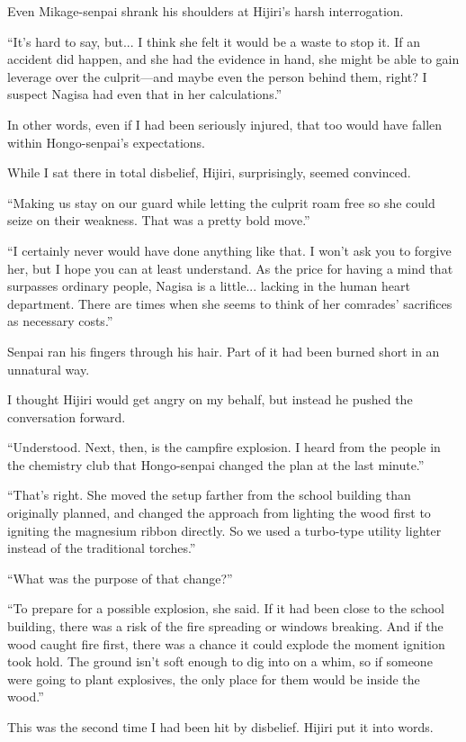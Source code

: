 \documentclass[
    a4paper,
    12pt,
    twoside,
    openany,
    UTF8,
    fontset=windows
]{ctexbook}
\begin{document}
Even Mikage-senpai shrank his shoulders at Hijiri's harsh interrogation.

``It's hard to say, but... I think she felt it would be a waste to stop it. If an accident did happen, and she had the evidence in hand, she might be able to gain leverage over the culprit---and maybe even the person behind them, right? I suspect Nagisa had even that in her calculations.''

In other words, even if I had been seriously injured, that too would have fallen within Hongo-senpai's expectations.

While I sat there in total disbelief, Hijiri, surprisingly, seemed convinced.

``Making us stay on our guard while letting the culprit roam free so she could seize on their weakness. That was a pretty bold move.''

``I certainly never would have done anything like that. I won't ask you to forgive her, but I hope you can at least understand. As the price for having a mind that surpasses ordinary people, Nagisa is a little... lacking in the human heart department. There are times when she seems to think of her comrades' sacrifices as necessary costs.''

Senpai ran his fingers through his hair. Part of it had been burned short in an unnatural way.

I thought Hijiri would get angry on my behalf, but instead he pushed the conversation forward.

``Understood. Next, then, is the campfire explosion. I heard from the people in the chemistry club that Hongo-senpai changed the plan at the last minute.''

``That's right. She moved the setup farther from the school building than originally planned, and changed the approach from lighting the wood first to igniting the magnesium ribbon directly. So we used a turbo-type utility lighter instead of the traditional torches.''

``What was the purpose of that change?''

``To prepare for a possible explosion, she said. If it had been close to the school building, there was a risk of the fire spreading or windows breaking. And if the wood caught fire first, there was a chance it could explode the moment ignition took hold. The ground isn't soft enough to dig into on a whim, so if someone were going to plant explosives, the only place for them would be inside the wood.''

This was the second time I had been hit by disbelief. Hijiri put it into words.
\end{document}
